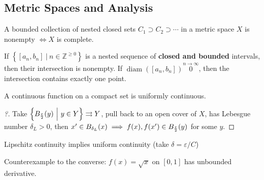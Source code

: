 \hypertarget{metric-spaces-and-analysis}{%
\subsection{Metric Spaces and
Analysis}\label{metric-spaces-and-analysis}}

\begin{theorem}

A bounded collection of nested closed sets
\(C_1 \supset C_2 \supset \cdots\) in a metric space \(X\) is nonempty
\(\iff X\) is complete.

\end{theorem}

\begin{theorem}

If
\(\left\{{[a_n, b_n] {~\mathrel{\Big|}~}n\in {\mathbb{Z}}^{\geq 0}}\right\}\)
is a nested sequence of \textbf{closed and bounded} intervals, then
their intersection is nonempty. If
\({\operatorname{diam}}([a_n, b_n]) \overset{n\to\infty}0\), then the
intersection contains exactly one point.

\end{theorem}

\begin{proposition}

A continuous function on a compact set is uniformly continuous.

\end{proposition}

\begin{proof}[?]

Take
\(\left\{{B_{\varepsilon\over 2}(y) {~\mathrel{\Big|}~}y\in Y}\right\}\rightrightarrows Y\),
pull back to an open cover of \(X\), has Lebesgue number
\(\delta_L > 0\), then
\(x' \in B_{\delta_L}(x) \implies f(x), f(x') \in B_{\varepsilon\over 2}(y)\)
for some \(y\).

\end{proof}

\begin{corollary}

Lipschitz continuity implies uniform continuity (take
\(\delta = \varepsilon/C\))

\end{corollary}

\begin{remark}

Counterexample to the converse: \(f(x) = \sqrt x\) on \([0, 1]\) has
unbounded derivative.

\end{remark}

